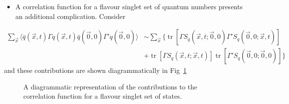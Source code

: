 \begin{itemize}
  \item A correlation function for a flavour singlet set of quantum numbers presents an additional complication. Consider
\end{itemize}
\begin{align}
    \sum_{\vec{x}} \langle \bar{q}(\vec{x},t) \Gamma q(\vec{x}, t) \bar{q}(\vec{0},0)\Gamma' q(\vec{0}, 0) \rangle &\sim \sum_{\vec{x}} \bigg\{ \operatorname{tr}[\Gamma S_q(\vec{x},t;\vec{0},0)\Gamma' S_q(\vec{0},0;\vec{x},t)] \nonumber \\
    &+ \operatorname{tr}[\Gamma S_q(\vec{x},t;\vec{x},t)]\operatorname{tr}[\Gamma' S_q(\vec{0},0;\vec{0},0)]\bigg\}
\end{align}
and these contributions are shown diagrammatically in Fig~\ref{fig:fss}
%
\begin{figure}
    \centering
    \caption{A diagrammatic representation of the contributions to the correlation function for a flavour singlet set of states.}
    \label{fig:fss}
\end{figure}
